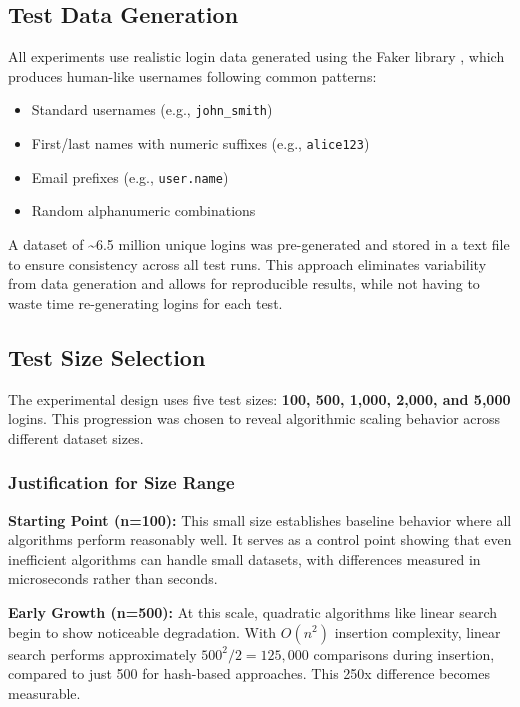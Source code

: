 \subsection{Test Data Generation}

All experiments use realistic login data generated using the Faker library \cite{faker2024}, which produces human-like usernames following common patterns:
\begin{itemize}
    \item Standard usernames (e.g., \texttt{john\_smith})
    \item First/last names with numeric suffixes (e.g., \texttt{alice123})
    \item Email prefixes (e.g., \texttt{user.name})
    \item Random alphanumeric combinations
\end{itemize}

A dataset of \textasciitilde6.5 million unique logins was pre-generated and stored in a text file to ensure consistency across all test runs. This approach eliminates variability from data generation and allows for reproducible results, while not having to waste time re-generating logins for each test.

\subsection{Test Size Selection}

The experimental design uses five test sizes: \textbf{100, 500, 1,000, 2,000, and 5,000} logins. This progression was chosen to reveal algorithmic scaling behavior across different dataset sizes.

\subsubsection{Justification for Size Range}

\textbf{Starting Point (n=100):} This small size establishes baseline behavior where all algorithms perform reasonably well. It serves as a control point showing that even inefficient algorithms can handle small datasets, with differences measured in microseconds rather than seconds.

\textbf{Early Growth (n=500):} At this scale, quadratic algorithms like linear search begin to show noticeable degradation. With $O(n^2)$ insertion complexity, linear search performs approximately $500^2/2 = 125,000$ comparisons during insertion, compared to just 500 for hash-based approaches. This 250x difference becomes measurable.

